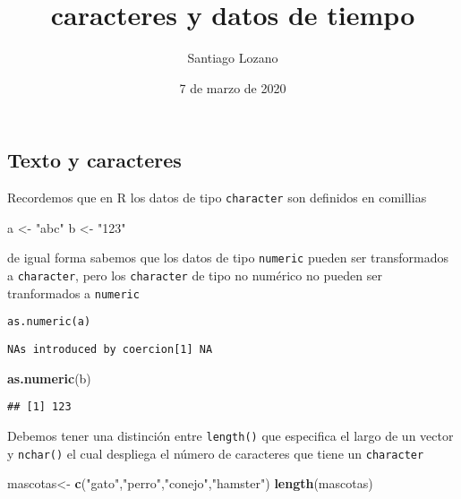 \documentclass[]{article}
\title{caracteres y datos de tiempo}
\author{Santiago Lozano}
\date{7 de marzo de 2020}
\newenvironment{Shaded}{\begin{snugshade}}{\end{snugshade}}
\newcommand{\KeywordTok}[1]{\textcolor[rgb]{0.13,0.29,0.53}{\textbf{#1}}}
\newcommand{\StringTok}[1]{\textcolor[rgb]{0.31,0.60,0.02}{#1}}
\newcommand{\NormalTok}[1]{#1}
\begin{document}
\maketitle

\subsection{Texto y caracteres}\label{texto-y-caracteres}

Recordemos que en R los datos de tipo \texttt{character} son definidos
en comillias

\begin{Shaded}
\begin{Highlighting}[]
\NormalTok{a <-}\StringTok{ "abc"}
\NormalTok{b <-}\StringTok{ "123"}
\end{Highlighting}
\end{Shaded}

de igual forma sabemos que los datos de tipo \texttt{numeric} pueden ser
transformados a \texttt{character}, pero los \texttt{character} de tipo
no numérico no pueden ser tranformados a \texttt{numeric}

\begin{verbatim}
as.numeric(a)
\end{verbatim}

\begin{verbatim}
NAs introduced by coercion[1] NA
\end{verbatim}

\begin{Shaded}
\begin{Highlighting}[]
\KeywordTok{as.numeric}\NormalTok{(b)}
\end{Highlighting}
\end{Shaded}

\begin{verbatim}
## [1] 123
\end{verbatim}

Debemos tener una distinción entre \texttt{length()} que especifica el
largo de un vector y \texttt{nchar()} el cual despliega el número de
caracteres que tiene un \texttt{character}

\begin{Shaded}
\begin{Highlighting}[]
\NormalTok{mascotas<-}\StringTok{ }\KeywordTok{c}\NormalTok{(}\StringTok{"gato"}\NormalTok{,}\StringTok{"perro"}\NormalTok{,}\StringTok{"conejo"}\NormalTok{,}\StringTok{"hamster"}\NormalTok{)}
\KeywordTok{length}\NormalTok{(mascotas)}
\end{Highlighting}
\end{Shaded}
\end{document}
